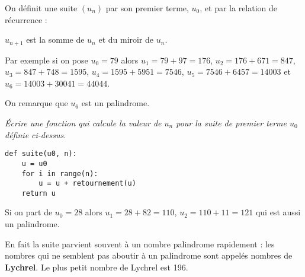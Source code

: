 On définit une suite $(u_n)$ par son premier terme, $u_0$, et par la relation de récurrence :

$u_{n+1}$ est la somme de $u_n$ et du miroir de $u_n$.

Par exemple si on pose $u_0=79$ alors $u_1=79+97=176$, $u_2 = 176+671=847$, $u_3 = 847+748=1595$, $u_4=1595+5951=7546$, $u_5=7546+6457=14003$ et $u_6=14003+30041=44044$.

On remarque que $u_6$ est un palindrome.

\begin{Exercise}[title= Calcul des termes de la suite]\it 
Écrire une fonction  qui calcule la valeur de $u_n$ pour la suite de premier terme $u_0$ définie ci-dessus.
\end{Exercise}
\begin{Answer}
\begin{lstlisting}
def suite(u0, n):
    u = u0
    for i in range(n):
        u = u + retournement(u)
    return u
\end{lstlisting}
\newpage
\end{Answer}
Si on part de $u_0=28$ alors $u_1=28+82=110$, $u_2=110+11=121$ qui est aussi un palindrome.

En fait la suite parvient souvent à un nombre palindrome rapidement : les nombres qui ne semblent pas aboutir à un palindrome sont appelés nombres de {\bf Lychrel}. Le plus petit nombre de Lychrel est 196. 

